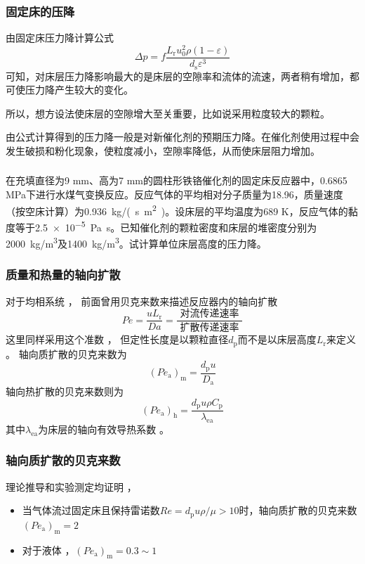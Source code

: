 \documentclass[dvipsnames, svgnames, x11names]{beamer}
\begin{document}
\begin{frame}
    \frametitle{固定床的压降}

    由固定床压力降计算公式
    \[
        \Delta p=f \frac{L_{\mathrm{r}} u_0^{2} \rho(1-\varepsilon)}{d_{\mathrm{s}} \varepsilon^{3}}
    \]
    可知，对床层压力降影响最大的是床层的空隙率和流体的流速，两者稍有增加，都可使压力降产生较大的变化。
    
    所以，想方设法使床层的空隙增大至关重要，比如说采用粒度较大的颗粒。
    
    由公式计算得到的压力降一般是对新催化剂的预期压力降。在催化剂使用过程中会发生破损和粉化现象，使粒度减小，空隙率降低，从而使床层阻力增加。

    

\end{frame}


\begin{frame}[t]
    \frametitle{}

    \begin{example}
        在充填直径为9 mm、高为7 mm的圆柱形铁铬催化剂的固定床反应器中，0.6865 MPa下进行水煤气变换反应。反应气体的平均相对分子质量为18.96，质量速度（按空床计算）为\SI{0.936}{kg/(s.m^2)}。设床层的平均温度为689 K，反应气体的黏度等于\SI{2.5e-5}{Pa.s}。已知催化剂的颗粒密度和床层的堆密度分别为\SI{2000}{kg/m^3}及\SI{1400}{kg/m^3}。试计算单位床层高度的压力降。
    \end{example}

\end{frame}


\begin{frame}
    \frametitle{质量和热量的轴向扩散}
    对于均相系统 ， 前面曾用贝克来数来描述反应器内的轴向扩散
    \[
        P e=\frac{u L_{\mathrm{r}}}{D a}=\frac{\text { 对流传递速率 }}{\text { 扩散传递速率 }}
    \]
    这里同样采用这个准数 ， 但定性长度是以颗粒直径$d_\mathrm{p}$而不是以床层高度$L_{\mathrm{r}}$来定义 。 轴向质扩散的贝克来数为
    \[
        (P e_\mathrm{a})_\mathrm{m}=\frac{d_\mathrm{p}u}{D_\mathrm{a}}
    \]
    轴向热扩散的贝克来数则为
    \[
        (P e_\mathrm{a})_\mathrm{h}=\frac{d_\mathrm{p}u\rho C_\mathrm{p}}{\lambda_\mathrm{ea}}
    \]
    其中$\lambda_\mathrm{ea}$为床层的轴向有效导热系数 。
\end{frame}


\begin{frame}
    \frametitle{轴向质扩散的贝克来数}
    理论推导和实验测定均证明 ， 
    \begin{itemize}
      \item 当气体流过固定床且保持雷诺数$Re = d_\mathrm{p}u\rho/\mu>10$时，轴向质扩散的贝克来数$(P e_\mathrm{a})_\mathrm{m}=2$
      \item 对于液体 ，$(P e_\mathrm{a})_\mathrm{m}=0.3\sim 1$
    \end{itemize}

\end{frame}
\end{document}
